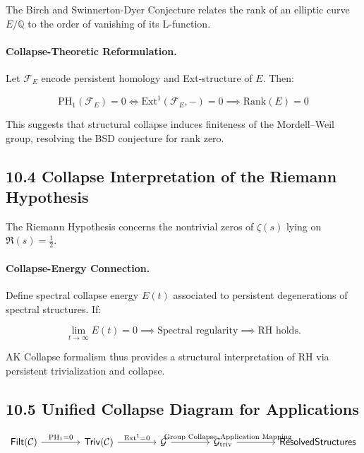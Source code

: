 \documentclass[11pt]{article}
\begin{document}
The Birch and Swinnerton-Dyer Conjecture relates the rank of an elliptic curve \( E/\mathbb{Q} \) to the order of vanishing of its L-function.

\paragraph{Collapse-Theoretic Reformulation.}
Let \( \mathcal{F}_E \) encode persistent homology and Ext-structure of \( E \). Then:

\[
\mathrm{PH}_1(\mathcal{F}_E) = 0 \iff \mathrm{Ext}^1(\mathcal{F}_E, -) = 0 \implies \mathrm{Rank}(E) = 0
\]

This suggests that structural collapse induces finiteness of the Mordell–Weil group, resolving the BSD conjecture for rank zero.

\subsection*{10.4 Collapse Interpretation of the Riemann Hypothesis}

The Riemann Hypothesis concerns the nontrivial zeros of \( \zeta(s) \) lying on \( \Re(s) = \frac{1}{2} \).

\paragraph{Collapse-Energy Connection.}
Define spectral collapse energy \( E(t) \) associated to persistent degenerations of spectral structures. If:

\[
\lim_{t \to \infty} E(t) = 0 \implies \text{Spectral regularity} \implies \text{RH holds}.
\]

AK Collapse formalism thus provides a structural interpretation of RH via persistent trivialization and collapse.

\subsection*{10.5 Unified Collapse Diagram for Applications}

\[
\begin{tikzcd}[column sep=4em]
\mathsf{Filt}(\mathcal{C}) \arrow[r, "\mathrm{PH}_1 = 0"]
& \mathsf{Triv}(\mathcal{C}) \arrow[r, "\mathrm{Ext}^1 = 0"]
& \mathcal{G} \arrow[r, "\text{Group Collapse}"]
& \mathcal{G}_{\mathrm{triv}} \arrow[r, "\text{Application Mapping}"]
& \mathsf{Resolved Structures}
\end{tikzcd}
\]
\end{document}
